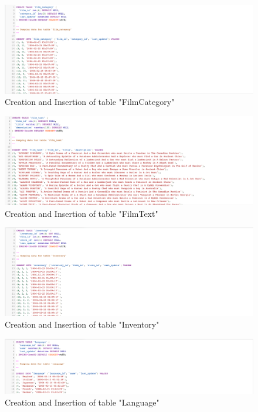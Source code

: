 \documentclass[openany]{article}
\begin{document}
	\begin{figure}[H]
		\includegraphics[width=\textwidth]{table_filmcategory_cins}
		\caption{Creation and Insertion of table "Film\textunderscore Category"}	
	\end{figure}
	\begin{figure}[H]
		\includegraphics[width=\textwidth]{table_filmtext_cins}
		\caption{Creation and Insertion of table "Film\textunderscore Text"}	
	\end{figure}
	\begin{figure}[H]
		\includegraphics[width=\textwidth]{table_inventory_cins}
		\caption{Creation and Insertion of table "Inventory"}	
	\end{figure}
	\begin{figure}[H]
		\includegraphics[width=\textwidth]{table_language_cins}
		\caption{Creation and Insertion of table "Language"}	
	\end{figure}
\end{document}
